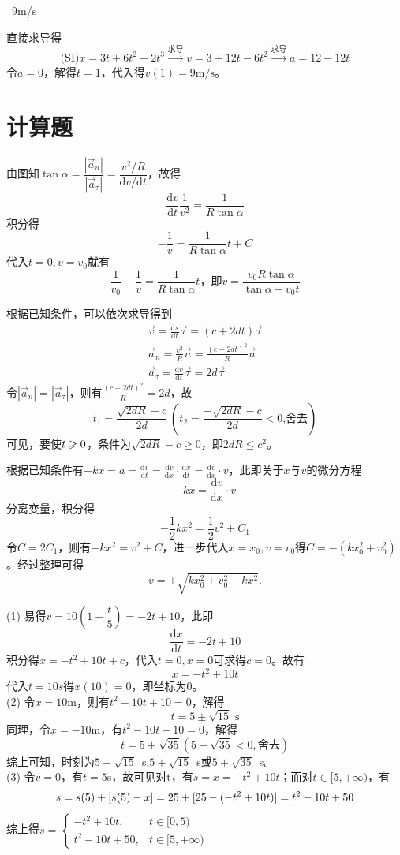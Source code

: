 \documentclass[b5paper,opensource,sourcefont,parskip]{qyxf-book}
\newcommand{\di}[1]{\mathrm{d}#1}
\newcommand{\dy}[2]{\frac{\di{#1}}{\di{#2}}}
\begin{document}
\ 9m/s 

\solve 直接求导得
\[\text{(SI)} x=3t+6t^2-2t^3\xrightarrow{\text{求导}}v=3+12t-6t^2
\xrightarrow{\text{求导}}a=12-12t\]
令$a=0$，解得$t=1$，代入得$v(1)=9\mathrm{m/s}$。

\section{计算题}



\solve 由图知$\tan\alpha=\dfrac{|\vec{a}_n|}{|\vec{a}_\tau|}=\dfrac{v^2/R}{\di{v}/\di{t}}$，故得
\[\dy{v}{t}\frac{1}{v^2}=\frac{1}{R\tan\alpha}\]
积分得
\[-\frac{1}{v}=\frac{1}{R\tan\alpha}t+C\]
代入$t=0,v=v_0$就有
\[\frac{1}{v_0}-\frac{1}{v}=\frac{1}{R\tan\alpha}t
\text{，即}v=\frac{v_0R\tan\alpha}{\tan\alpha-v_0t}
\]


\solve 根据已知条件，可以依次求导得到
\begin{gather*}
\vec{v}=\dy{s}{t}\vec{\tau}=(c+2dt)\vec{\tau}\\  
\vec{a}_n=\frac{v^2}{R}\vec{n}=\frac{(c+2dt)^2}{R}\vec{n}\\
\vec{a}_\tau=\dy{v}{t}\vec{\tau}=2d\vec{\tau}
\end{gather*}
令$|\vec{a}_n|=|\vec{a}_\tau|$，则有$\frac{(c+2dt)^2}{R}=2d$，故
\[t_1=\frac{\sqrt{2dR}-c}{2d}\ \left(t_2=\frac{-\sqrt{2dR}-c}{2d}<0\text{,舍去}\right)\]
可见，要使$t\geqslant\text0$，条件为$\sqrt{2dR}-c\geqslant0$，即$2dR\leqslant c^2$。



\solve 根据已知条件有$-kx=a=\dy{v}{t}=\dy{v}{x}\cdot \dy{x}{t}=\dy{v}{x}\cdot v$，此即关于$x$与$v$的微分方程
\[-kx=\dy{v}{x}\cdot v\]
分离变量，积分得
\[-\dfrac{1}{2}kx^2=\dfrac{1}{2}v^2+C_1\]
令$C=2C_1$，则有$-kx^2=v^2+C$，进一步代入$x=x_0,v=v_0$得$C=-(kx_0^2+v_0^2)$。经过整理可得
\[v=\pm\sqrt{kx_0^2+v_0^2-kx^2}.\]



\solve (1) 易得$v=10\left(1-\dfrac{t}{5}\right)=-2t+10$，此即
\[
\dy{x}{t}=-2t+10
\]
积分得$x=-t^2+10t+c$，代入$t=0,x=0$可求得$c=0$。故有
\[x=-t^2+10t\]
代入$t=10s$得$x(10)=0$，即坐标为0。\\
(2) 令$x=10$m，则有$t^2-10t+10=0$，解得
\[t=5\pm\sqrt{15}\text{ s}\]
同理，令$x=-10$m，有$t^2-10t+10=0$，解得
\[t=5+\sqrt{35}(5-\sqrt{35}<0,\text{舍去})\]
综上可知，时刻为$5-\sqrt{15}$\ s,$5+\sqrt{15}$\ s或$5+\sqrt{35}$\ s。\\
(3) 令$v=0$，有$t=5$s，故可见对t\in[0,5]，有$s=x=-t^2+10t$；而对$t\in[5,+\infty)$，有
\[s=s(5)+[s(5)-x]=25\\+[25-(-t^2+10t)]=t^2-10t+50\]
综上得$s=
\begin{cases}
-t^2+10t,&t\in[0,5)\\
t^2-10t+50,&t\in[5,+\infty)
\end{cases}$
\end{document}
